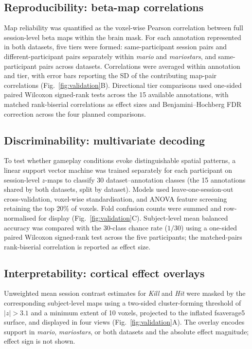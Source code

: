 \documentclass{article}
\begin{document}
\subsection*{Reproducibility: beta-map correlations}
Map reliability was quantified as the voxel-wise Pearson correlation between full session-level
beta maps within the brain mask. For each annotation represented in both datasets, five tiers
were formed: same-participant session pairs and different-participant pairs separately within
\textit{mario} and \textit{mariostars}, and same-participant pairs across datasets. Correlations
were averaged within annotation and tier, with error bars reporting the SD of the contributing
map-pair correlations (Fig.~\ref{fig:validation}B). Directional tier comparisons used one-sided
paired Wilcoxon signed-rank tests across the 15 available annotations, with matched rank-biserial
correlations as effect sizes and Benjamini--Hochberg FDR correction across the four planned
comparisons.

\subsection*{Discriminability: multivariate decoding}
To test whether gameplay conditions evoke distinguishable spatial patterns, a linear support
vector machine\cite{pedregosa2011sklearn} was trained separately for each participant on
session-level $z$-maps to classify 30 dataset--annotation classes (the 15 annotations shared by
both datasets, split by dataset). Models used leave-one-session-out cross-validation, voxel-wise
standardisation, and ANOVA feature screening retaining the top 20\% of voxels. Fold confusion
counts were summed and row-normalised for display (Fig.~\ref{fig:validation}C). Subject-level
mean balanced accuracy was compared with the 30-class chance rate ($1/30$) using a one-sided
paired Wilcoxon signed-rank test across
the five participants; the matched-pairs rank-biserial correlation is reported as effect size.

\subsection*{Interpretability: cortical effect overlays}
Unweighted mean session contrast estimates for \textit{Kill} and \textit{Hit} were masked by the
corresponding subject-level maps using a two-sided cluster-forming threshold of $|z|>3.1$ and a
minimum extent of 10 voxels, projected to the inflated fsaverage5 surface, and displayed in four
views (Fig.~\ref{fig:validation}A). The overlay encodes support in \textit{mario},
\textit{mariostars}, or both datasets and the absolute effect magnitude; effect sign is not
shown.
\end{document}
